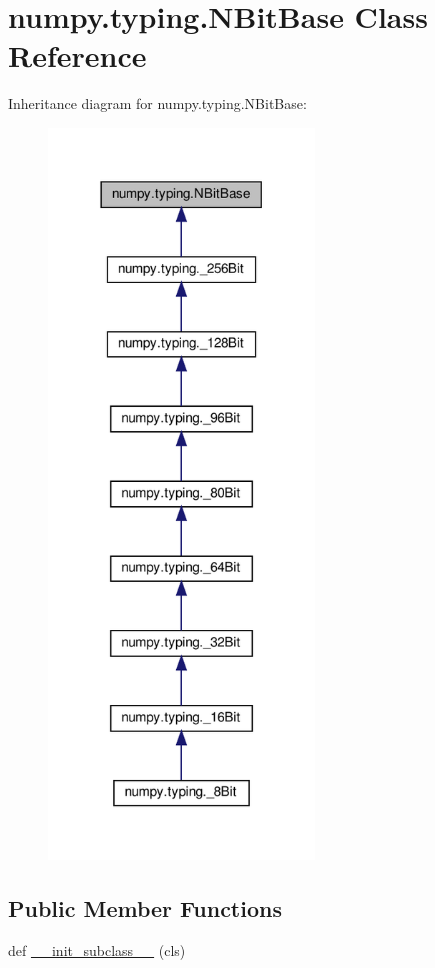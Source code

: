 \hypertarget{classnumpy_1_1typing_1_1NBitBase}{}\section{numpy.\+typing.\+N\+Bit\+Base Class Reference}
\label{classnumpy_1_1typing_1_1NBitBase}


Inheritance diagram for numpy.\+typing.\+N\+Bit\+Base\+:
\nopagebreak
\begin{figure}[H]
\begin{center}
\leavevmode
\includegraphics[width=200pt]{classnumpy_1_1typing_1_1NBitBase__inherit__graph}
\end{center}
\end{figure}
\subsection*{Public Member Functions}
\begin{DoxyCompactItemize}
\item 
def \hyperlink{classnumpy_1_1typing_1_1NBitBase_a89234b85204162e77a9a59608b85369a}{\+\_\+\+\_\+init\+\_\+subclass\+\_\+\+\_\+} (cls)
\end{DoxyCompactItemize}


